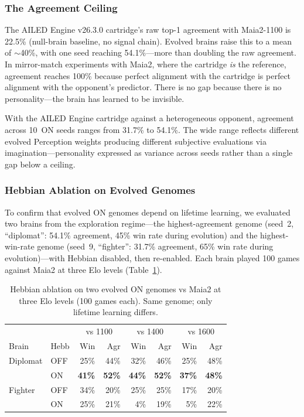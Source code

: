\documentclass[11pt,a4paper]{article}
\begin{document}
\subsubsection{The Agreement Ceiling}

The AILED Engine v26.3.0 cartridge's raw top-1 agreement with Maia2-1100 is 22.5\% (null-brain baseline, no signal chain).
Evolved brains raise this to a mean of $\sim$40\%, with one seed reaching 54.1\%---more than doubling the raw agreement.
In mirror-match experiments with Maia2, where the cartridge \emph{is} the reference, agreement reaches 100\% because perfect alignment with the cartridge is perfect alignment with the opponent's predictor.
There is no gap because there is no personality---the brain has learned to be invisible.

With the AILED Engine cartridge against a heterogeneous opponent, agreement across 10~ON seeds ranges from 31.7\% to 54.1\%.
The wide range reflects different evolved Perception weights producing different subjective evaluations via imagination---personality expressed as variance across seeds rather than a single gap below a ceiling.

\subsubsection{Hebbian Ablation on Evolved Genomes}

To confirm that evolved ON genomes depend on lifetime learning, we evaluated two brains from the exploration regime---the highest-agreement genome (seed~2, ``diplomat'': 54.1\% agreement, 45\% win rate during evolution) and the highest-win-rate genome (seed~9, ``fighter'': 31.7\% agreement, 65\% win rate during evolution)---with Hebbian disabled, then re-enabled.
Each brain played 100 games against Maia2 at three Elo levels (Table~\ref{tab:ablation}).

\begin{table}[t]
\caption{Hebbian ablation on two evolved ON genomes vs Maia2 at three Elo levels (100 games each). Same genome; only lifetime learning differs.}
\label{tab:ablation}
\centering
\small
\begin{tabular}{@{}llrrrrrr@{}}
\toprule
 & & \multicolumn{2}{c}{vs 1100} & \multicolumn{2}{c}{vs 1400} & \multicolumn{2}{c}{vs 1600} \\
Brain & Hebb & Win & Agr & Win & Agr & Win & Agr \\
\midrule
Diplomat & OFF & 25\% & 44\% & 32\% & 46\% & 25\% & 48\% \\
         & ON  & \textbf{41\%} & \textbf{52\%} & \textbf{44\%} & \textbf{52\%} & \textbf{37\%} & \textbf{48\%} \\
\midrule
Fighter  & OFF & 34\% & 20\% & 25\% & 25\% & 17\% & 20\% \\
         & ON  & 25\% & 21\% & 4\% & 19\% & 5\% & 22\% \\
\bottomrule
\end{tabular}
\end{table}
\end{document}
